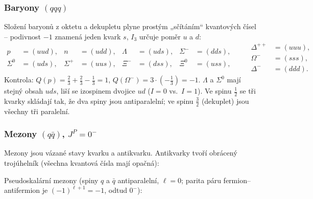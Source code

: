 \subsubsection*{Baryony \((qqq)\)}
Složení baryonů z oktetu a dekupletu plyne prostým „sčítáním“ kvantových
čísel -- podivnost \(-1\) znamená jeden kvark \(s\), \(I_3\) určuje poměr
\(u\) a \(d\):
\[
\begin{aligned}
  p&=(uud), & n&=(udd), & \Lambda&=(uds), & \Sigma^-&=(dds),\\
  \Sigma^0&=(uds), & \Sigma^+&=(uus), & \Xi^-&=(dss), & \Xi^0&=(uss),
\end{aligned}
\qquad
\begin{aligned}
  \Delta^{++}&=(uuu),\\ \Omega^-&=(sss),\\ \Delta^-&=(ddd).
\end{aligned}
\]
Kontrola: \(Q(p)=\tfrac23+\tfrac23-\tfrac13=1\), \(Q(\Omega^-)=3\cdot(-\tfrac13)
=-1\). \(\Lambda\) a \(\Sigma^0\) mají stejný obsah \(uds\), liší se izospinem
dvojice \(ud\) (\(I=0\) vs.\ \(I=1\)). Ve spinu \(\tfrac12\) se tři kvarky
skládají tak, že dva spiny jsou antiparalelní; ve spinu \(\tfrac32\)
(dekuplet) jsou všechny tři paralelní.

\subsubsection*{Mezony \((q\bar q)\), \(J^P=0^-\)}
Mezony jsou vázané stavy kvarku a antikvarku. Antikvarky tvoří obrácený
trojúhelník (všechna kvantová čísla mají opačná):
\begin{center}
\end{center}
Pseudoskalární mezony (spiny \(q\) a \(\bar q\) antiparalelní, \(\ell=0\);
parita páru fermion--antifermion je \((-1)^{\ell+1}=-1\), odtud \(0^-\)):

